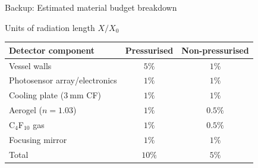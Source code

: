 \documentclass{beamer}
\begin{document}
\begin{frame}{Backup: Estimated material budget breakdown}
  \begin{center}
    Units of radiation length $X/X_0$
    \begin{tabular}{lcc}
        \hline
        Detector component                           & Pressurised & Non-pressurised \\
        \hline
        Vessel walls                                 & $5\%$                         & $1\%$ \\
        Photosensor array/electronics                & $1\%$                         & $1\%$ \\
        Cooling plate ($\SI{3}{\milli\meter}$ CF)    & $1\%$                         & $1\%$ \\
        Aerogel ($n = 1.03$)                         & $1\%$                         & $0.5\%$ \\
        C$_4$F$_{10}$ gas                              & $1\%$                         & $0.5\%$ \\
        Focusing mirror                              & $1\%$                         & $1\%$ \\
        \hline
        Total                                        & $10\%$                        & $5\%$ \\
        \hline
    \end{tabular}
  \end{center}
\end{frame}
\end{document}
